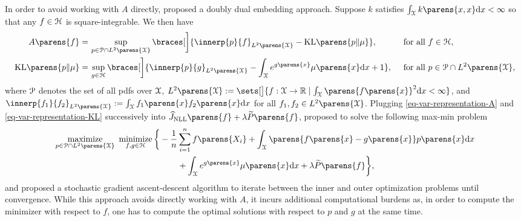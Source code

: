 In order to avoid working with $A$ directly, \textcite{Dai2018-tp} proposed a doubly dual embedding approach. Suppose $k$ satisfies $\int_{\calX} k \parens{x, x} \diff x < \infty$ so that any $f \in \mathcal{H}$ is square-integrable. We then have 
\begin{align}
	A \parens{f} = & \, \sup_{p \in \calP \cap L^2 \parens{\calX}} \braces[\bigg]{\innerp{p}{f}_{L^2 \parens{\calX}} - \KLdiv \parens{p \Vert \mu}}, && \, \text{ for all } f \in \calH, \label{eq-var-representation-A} \\ 
	\KLdiv \parens{p \Vert \mu} = & \, \sup_{g \in \calH} \braces[\bigg]{\innerp{p}{g}_{L^2 \parens{\calX}} - \int_{\calX} e^{g \parens{x}} \mu \parens{x} \diff x + 1}, && \, \text{ for all } p \in \calP \cap L^2 \parens{\calX}, \label{eq-var-representation-KL}
\end{align}
where $\mathcal{P}$ denotes the set of all pdfs over $\mathcal{X}$, $L^2 \parens{\calX} := \sets[\big]{f: \calX \to \Real \mid \int_{\calX} \parens{f \parens{x}}^2 \diff x < \infty}$, and $\innerp{f_1}{f_2}_{L^2 \parens{\calX}} := \int_{\calX} f_1 \parens{x} f_2 \parens{x} \diff x$ for all $f_1, f_2 \in L^2 \parens{\calX}$. Plugging \eqref{eq-var-representation-A} and \eqref{eq-var-representation-KL} successively into $\widehat{J}_{\NLL} \parens{f} + \lambda \widetilde{P} \parens{f}$, \textcite{Dai2018-tp} proposed to solve the following max-min problem 
\begin{align*}
	\maximize_{p \in \calP \cap L^2 \parens{\calX}} \ \minimize_{f, g \in \calH} & \, \bigg\{- \frac{1}{n} \sum_{i=1}^n f \parens{X_i} + \int_{\calX} \parens{f \parens{x} - g \parens{x}} p \parens{x} \diff x \nonumber \\ 
	& \qquad \quad + \int_{\calX} e^{g \parens{x}} \mu \parens{x} \diff x + \lambda \widetilde{P} \parens{f} \bigg\}, %
\end{align*}
and 
proposed a stochastic gradient ascent-descent algorithm to iterate between the inner and outer optimization problems until convergence. While this approach avoids directly working with $A$, it incurs additional computational burdens as, in order to compute the minimizer with respect to $f$, one has to compute the optimal solutions with respect to $p$ and $g$ at the same time. 

